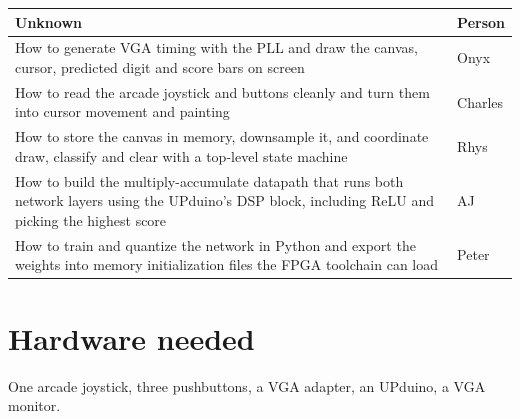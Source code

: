 \documentclass[11pt]{article}
\begin{document}
\begin{tabularx}{\textwidth}{X l}
\toprule
\textbf{Unknown} & \textbf{Person} \\
\midrule
How to generate VGA timing with the PLL and draw the canvas, cursor, predicted digit and score bars on screen & Onyx \\
How to read the arcade joystick and buttons cleanly and turn them into cursor movement and painting & Charles \\
How to store the canvas in memory, downsample it, and coordinate draw, classify and clear with a top-level state machine & Rhys \\
How to build the multiply-accumulate datapath that runs both network layers using the UPduino's DSP block, including ReLU and picking the highest score & AJ \\
How to train and quantize the network in Python and export the weights into memory initialization files the FPGA toolchain can load & Peter \\
\bottomrule
\end{tabularx}

\section{Hardware needed}

One arcade joystick, three pushbuttons, a VGA adapter, an UPduino, a VGA monitor.
\end{document}
